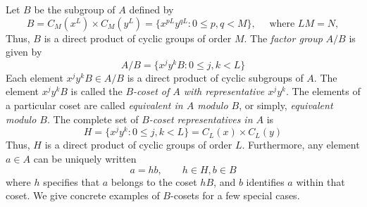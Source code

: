 Let $B$ be the subgroup of $A$ defined by
\[
B = C_M(x^L) \times C_M(y^L) = \{x^{pL} y^{qL} : 0 \leq p,q < M \}, \quad \text{ where } LM = N,
\]
Thus, $B$ is a direct product of cyclic groups of order $M$.
The \emph{factor group} $A/B$ is given by
\[
A/B = \{x^j y^k B : 0 \leq j,k < L \}
\]
Each element $x^j y^k B \in A/B$ is a direct product of cyclic subgroups of $A$.
The element $x^j y^k B$ is called the \emph{$B$-coset of $A$ with representative
$x^j y^k$}.  The elements of a particular coset are called \emph{equivalent in
$A$ modulo $B$}, or simply, \emph{equivalent modulo $B$}.
The complete set of \emph{$B$-coset representatives in $A$}  is 
\[
H = \{x^j y^k : 0 \leq j,k < L \} = C_L(x) \times C_L(y)
\]
Thus, $H$ is a direct product of cyclic groups of order $L$.
Furthermore, any element $a\in A$ can be uniquely written
\[
a = hb, \qquad h\in H, b\in B
\]
where $h$ specifies that $a$ belongs to the coset $hB$, and $b$ identifies $a$
within that coset. 
We give concrete examples of $B$-cosets for a few special cases.  
